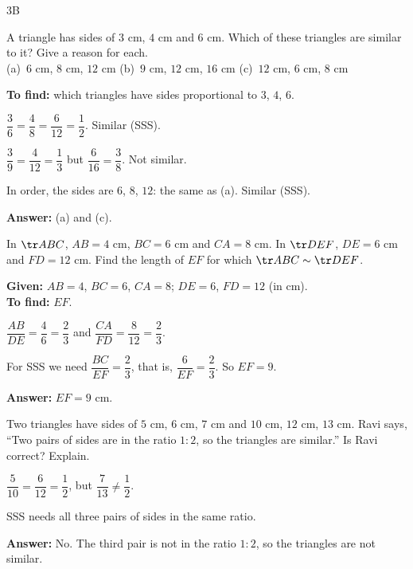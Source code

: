 \begin{exercise}{3B}
\item A triangle has sides of $3$ cm, $4$ cm and $6$ cm. Which of these triangles are similar to it? Give a reason for each.\\
(a)~$6$ cm, $8$ cm, $12$ cm \quad (b)~$9$ cm, $12$ cm, $16$ cm \quad (c)~$12$ cm, $6$ cm, $8$ cm
\begin{solution}
\textbf{To find:} which triangles have sides proportional to $3$, $4$, $6$.
\begin{steps}
  \item[(a)] $\dfrac36=\dfrac48=\dfrac{6}{12}=\dfrac12$. Similar (SSS).
  \item[(b)] $\dfrac39=\dfrac{4}{12}=\dfrac13$ but $\dfrac{6}{16}=\dfrac38$. Not similar.
  \item[(c)] In order, the sides are $6$, $8$, $12$: the same as (a). Similar (SSS).
\end{steps}
\textbf{Answer:} (a) and (c).
\end{solution}

\item In $\tr ABC$, $AB=4$ cm, $BC=6$ cm and $CA=8$ cm. In $\tr DEF$, $DE=6$ cm and $FD=12$ cm. Find the length of $EF$ for which $\tr ABC\sim\tr DEF$.
\begin{solution}
\textbf{Given:} $AB=4$, $BC=6$, $CA=8$; $DE=6$, $FD=12$ (in cm).\\
\textbf{To find:} $EF$.
\begin{steps}
  \item $\dfrac{AB}{DE}=\dfrac46=\dfrac23$ and $\dfrac{CA}{FD}=\dfrac{8}{12}=\dfrac23$.
  \item For SSS we need $\dfrac{BC}{EF}=\dfrac23$, that is, $\dfrac{6}{EF}=\dfrac23$. So $EF=9$.
\end{steps}
\textbf{Answer:} $EF=9$ cm.
\end{solution}

\item Two triangles have sides of $5$ cm, $6$ cm, $7$ cm and $10$ cm, $12$ cm, $13$ cm. Ravi says, ``Two pairs of sides are in the ratio $1:2$, so the triangles are similar.'' Is Ravi correct? Explain.
\begin{solution}
\begin{steps}
  \item $\dfrac{5}{10}=\dfrac{6}{12}=\dfrac12$, but $\dfrac{7}{13}\neq\dfrac12$.
  \item SSS needs all three pairs of sides in the same ratio.
\end{steps}
\textbf{Answer:} No. The third pair is not in the ratio $1:2$, so the triangles are not similar.
\end{solution}


\end{exercise}

